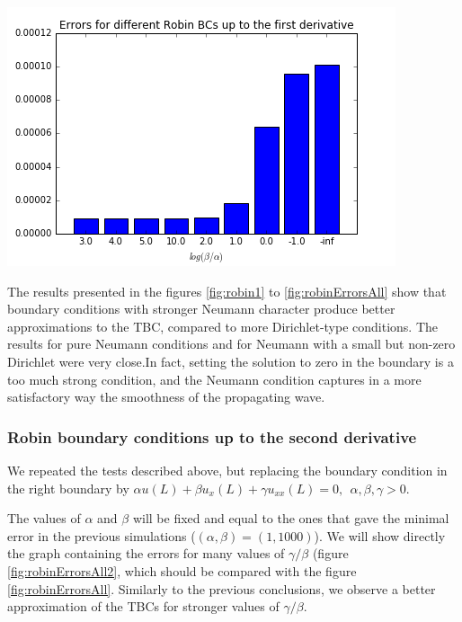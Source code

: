 \begin{center}
		\includegraphics[scale=.5]{figures/robinErrors1.png}
\end{center}


\indent The results presented in the figures \ref{fig:robin1} to \ref{fig:robinErrorsAll} show that boundary conditions with stronger Neumann character produce better approximations to the TBC, compared to more Dirichlet-type conditions. The results for pure Neumann conditions and for Neumann with a small but non-zero Dirichlet were very close.In fact, setting the solution to zero in the boundary is a too much strong condition, and the Neumann condition captures in a more satisfactory way the smoothness of the propagating wave.

\subsubsection{Robin boundary conditions up to the second derivative}

\indent We repeated the tests described above, but replacing the boundary condition in the right boundary by $\alpha u(L) + \beta u_x(L) + \gamma u_{xx}(L) = 0,  \ \ \alpha,\beta, \gamma > 0$.

\indent The values of $\alpha$ and $\beta$ will be fixed and equal to the ones that gave the minimal error in the previous simulations ($(\alpha,\beta) = (1,1000)$). We will show directly the graph containing the errors for many values of $\gamma/\beta$ (figure \ref{fig:robinErrorsAll2}, which should be compared with the figure \ref{fig:robinErrorsAll}. Similarly to the previous conclusions, we observe a better approximation of the TBCs for stronger values of $\gamma/\beta$.

